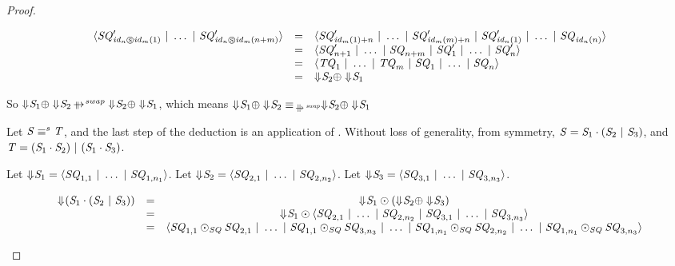 \documentclass[acmsmall]{acmart}
\begin{document}
\begin{proof}
\begin{case}[\OrCommutativityRule{}]
    \[
      \begin{array}{rcl}
        \langle\mathit{SQ}_{\mathit{id}_n\circledS\mathit{id}_m(1)}' ~|~ \ldots ~|~ 
        \mathit{SQ}_{\mathit{id}_n\circledS\mathit{id}_m(n+m)}'\rangle
        & = & \langle\mathit{SQ}_{\mathit{id}_m(1)+n}' ~|~ \ldots ~|~ \mathit{SQ}_{\mathit{id}_m(m)+n}' ~|~ 
              \mathit{SQ}_{\mathit{id}_n(1)}' ~|~ \ldots ~|~ \mathit{SQ}_{\mathit{id}_n(n)}\rangle\\
        & = & \langle\mathit{SQ}_{n+1}' ~|~ \ldots ~|~ \mathit{SQ}_{n+m} ~|~ 
              \mathit{SQ}_1' ~|~ \ldots ~|~ \mathit{SQ}_n'\rangle\\
        & = & \langle\mathit{TQ}_1 ~|~ \ldots ~|~ \mathit{TQ}_m ~|~ 
              \mathit{SQ}_1 ~|~ \ldots ~|~ \mathit{SQ}_n\rangle\\
        & = & \Downarrow\mkern-4mu \mathit{S}_2 \oplus \Downarrow\mkern-4mu \mathit{S}_1
      \end{array}
    \]

    So $\ToDNFRegexOf{\Regex_1} \OrDNF \ToDNFRegexOf{\Regex_2}
    \ParallelRewriteSwap
    \ToDNFRegexOf{\Regex_2} \OrDNF \ToDNFRegexOf{\Regex_1}$, which means
    $\ToDNFRegexOf{\Regex_1} \OrDNF \ToDNFRegexOf{\Regex_2}
    \EquivalenceOf{\ParallelRewriteSwap}
    \ToDNFRegexOf{\Regex_2} \OrDNF \ToDNFRegexOf{\Regex_1}$
  \end{case}

  \begin{case}[\DistributivityLeftRule{}]
    Let $\mathit{S} \equiv^s \mathit{T}$, and the last step of the
    deduction is an application of \DistributivityLeftRule{}.  Without loss of
    generality, from symmetry,
    $\mathit{S} = \mathit{S}_1 \cdot (\mathit{S}_2 ~|~ \mathit{S}_3)$, and
    $\mathit{T} = (\mathit{S}_1 \cdot \mathit{S}_2) ~|~ (\mathit{S}_1 \cdot \mathit{S}_3)$.

    Let $\Downarrow\mkern-4mu \mathit{S}_1 =
    \langle\mathit{SQ}_{1,1} ~|~ \ldots ~|~ \mathit{SQ}_{1,n_1}\rangle$.
    Let $\Downarrow\mkern-4mu \mathit{S}_2 =
    \langle\mathit{SQ}_{2,1} ~|~ \ldots ~|~ \mathit{SQ}_{2,n_2}\rangle$.
    Let $\Downarrow\mkern-4mu \mathit{S}_3 =
    \langle\mathit{SQ}_{3,1} ~|~ \ldots ~|~ \mathit{SQ}_{3,n_3}\rangle$.

    \[
      \begin{array}{ccc}
        \Downarrow\mkern-4mu (\mathit{S}_1 \cdot (\mathit{S}_2 ~|~ \mathit{S}_3))
        & = & \Downarrow\mkern-4mu \mathit{S}_1 \odot (\Downarrow\mkern-4mu \mathit{S}_2 \oplus
              \Downarrow\mkern-4mu \mathit{S}_3)\\
        & = & \Downarrow\mkern-4mu \mathit{S}_1 \odot
              \langle\mathit{SQ}_{2,1} ~|~ \ldots ~|~ \mathit{SQ}_{2,n_2} ~|~ 
              \mathit{SQ}_{3,1} ~|~ \ldots ~|~ \mathit{SQ}_{3,n_3}\rangle\\
        & = & \langle\mathit{SQ}_{1,1}\odot_{\mathit{SQ}}\mathit{SQ}_{2,1} ~|~ 
              \ldots ~|~ \mathit{SQ}_{1,1}\odot_{\mathit{SQ}}\mathit{SQ}_{3,n_3} ~|~ \ldots ~|~ 
              \mathit{SQ}_{1,n_1}\odot_{\mathit{SQ}}\mathit{SQ}_{2,n_2} ~|~ 
              \ldots ~|~ \mathit{SQ}_{1,n_1}\odot_{\mathit{SQ}}\mathit{SQ}_{3,n_3}\rangle
      \end{array}
    \]


\end{case}
\end{proof}
\end{document}
